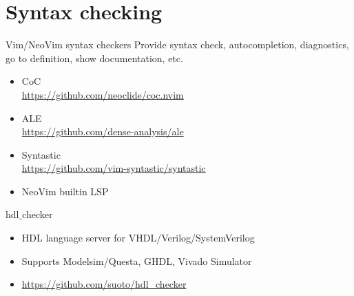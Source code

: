 \documentclass[aspectratio=169]{beamer}
\newcommand{\myurl}[1]{{\color{indigo}\url{#1}}}%
\begin{document}
\section*{Syntax checking}
\begin{frame}{\secname}

  \begin{block}{Vim/NeoVim syntax checkers}
    Provide syntax check, autocompletion, diagnostics, go to definition, show documentation, etc.
  \begin{itemize}
    \item CoC  \\ \myurl{https://github.com/neoclide/coc.nvim} 
    \item ALE \\ \myurl{https://github.com/dense-analysis/ale}
    \item Syntastic \\ \myurl{https://github.com/vim-syntastic/syntastic}
    \item NeoVim builtin LSP
  \end{itemize}
  \end{block}

  \begin{block}{hdl$\_$checker}
    \begin{itemize}
     \item HDL language server  for VHDL/Verilog/SystemVerilog
     \item Supports Modelsim/Questa, GHDL, Vivado Simulator
     \item \myurl{https://github.com/suoto/hdl_checker}
    \end{itemize}
    
  \end{block}
    
\end{frame}

\end{document}
